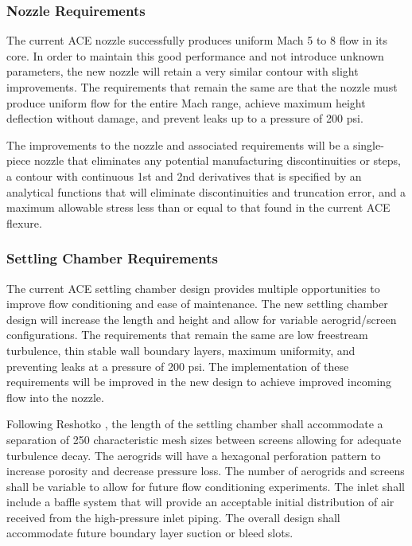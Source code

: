 \subsubsection*{Nozzle Requirements}

The current ACE nozzle successfully produces uniform Mach 5 to 8 flow in its core. In order to maintain this good performance and not introduce unknown parameters, the new nozzle will retain a very similar contour with slight improvements. The requirements that remain the same are that the nozzle must produce uniform flow for the entire Mach range, achieve maximum height deflection without damage, and prevent leaks up to a pressure of 200 psi.

The improvements to the nozzle and associated requirements will be a single-piece nozzle that eliminates any potential manufacturing discontinuities or steps, a contour with continuous 1st and 2nd derivatives that is specified by an analytical functions that will eliminate discontinuities and truncation error, and a maximum allowable stress less than or equal to that found in the current ACE flexure.

\subsubsection*{Settling Chamber Requirements}

The current ACE settling chamber design provides multiple opportunities to improve flow conditioning and ease of maintenance. The new settling chamber design will increase the length and height and allow for variable aerogrid/screen configurations. The requirements that remain the same are low freestream turbulence, thin stable wall boundary layers, maximum uniformity, and preventing leaks at a pressure of 200 psi. The implementation of these requirements will be improved in the new design to achieve improved incoming flow into the nozzle.

Following Reshotko \cite{reshotko}, the length of the settling chamber shall accommodate a separation of 250 characteristic mesh sizes between screens allowing for adequate turbulence decay. The aerogrids will have a hexagonal perforation pattern to increase porosity and decrease pressure loss. The number of aerogrids and screens shall be variable to allow for future flow conditioning experiments. The inlet shall include a baffle system that will provide an acceptable initial distribution of air received from the high-pressure inlet piping. The overall design shall accommodate future boundary layer suction or bleed slots.

